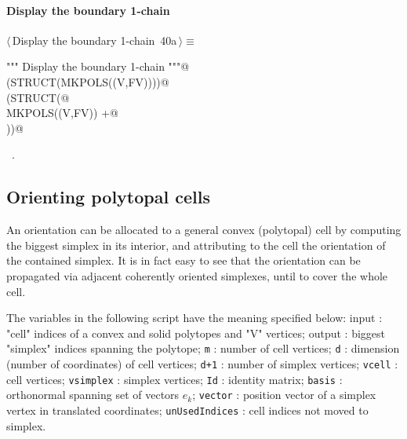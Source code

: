 \documentclass[11pt,oneside]{article}    %
\begin{document}
\paragraph{Display the boundary 1-chain}
\begin{flushleft} \small \label{scrap66}
\protect{}$\langle\,$Display the boundary 1-chain\nobreak\ {\footnotesize 40a}$\,\rangle\equiv$
\vspace{-1ex}
\begin{list}{}{} \item
\mbox{}\verb@""" Display the boundary 1-chain """@\\
\mbox{}\verb@VIEW(STRUCT(MKPOLS((V,FV))))@\\
\mbox{}\verb@VIEW(STRUCT(@\\
\mbox{}\verb@    MKPOLS((V,FV)) +@\\
\mbox{}  ))@\\
\mbox{}\verb@@{\NWsep}
\end{list}
\vspace{-1ex}
\footnotesize\addtolength{\baselineskip}{-1ex}
\begin{list}{}{\setlength{\itemsep}{-\parsep}\setlength{\itemindent}{-\leftmargin}}
\item \NWtxtMacroRefIn\ .
\end{list}
\end{flushleft}



\subsection{Orienting polytopal cells}

An orientation can be allocated to a general convex (polytopal) cell by computing the biggest simplex in its interior, and attributing to the cell the orientation of the contained simplex. 
It is in fact easy to see that the orientation can be propagated via adjacent coherently oriented simplexes, until to cover the whole cell.

The variables in the following script have the meaning specified below:
{input} :  "cell" indices of a convex and solid polytopes and "V" vertices;
{output} :  biggest "simplex" indices spanning the polytope;
{\tt m} : number of cell vertices;
{\tt d} : dimension (number of coordinates) of cell vertices;
{\tt d+1} : number of simplex vertices;
{\tt vcell} : cell vertices;
{\tt vsimplex} : simplex vertices;
{\tt Id} : identity matrix;
{\tt basis} : orthonormal spanning set of vectors $e_k$;
{\tt vector} : position vector of a simplex vertex in translated coordinates;
{\tt unUsedIndices} : cell indices not moved to simplex.
\end{document}
